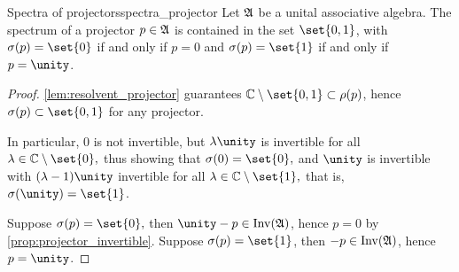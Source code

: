 \begin{proposition}{Spectra of projectors}{spectra_projector}
    Let \(\mathfrak{A}\) be a unital associative algebra. The spectrum of a projector \(p \in \mathfrak{A}\) is contained in the set \(\set{0,1}\), with \(\sigma(p) = \set{0}\) if and only if \(p = 0\) and \(\sigma(p) = \set{1}\) if and only if \(p = \unity\).
\end{proposition}
\begin{proof}
    \cref{lem:resolvent_projector} guarantees \(\mathbb{C} \setminus \set{0,1}\subset \rho(p)\), hence \(\sigma(p) \subset \set{0,1}\) for any projector.

    In particular, \(0\) is not invertible, but \(\lambda \unity\) is invertible for all \(\lambda \in \mathbb{C} \setminus \set{0},\) thus showing that \(\sigma(0) = \set{0},\) and \(\unity\) is invertible with \((\lambda - 1)\unity\) invertible for all \(\lambda \in \mathbb{C}\setminus\set{1},\) that is, \(\sigma(\unity) = \set{1}\).

    Suppose \(\sigma(p) = \set{0},\) then \(\unity - p \in \invertible{\algebra{A}}\), hence \(p = 0\) by \cref{prop:projector_invertible}. Suppose \(\sigma(p) = \set{1}\), then \(-p \in \operatorname{Inv}(\mathfrak{A})\), hence \(p = \unity\).
\end{proof}

